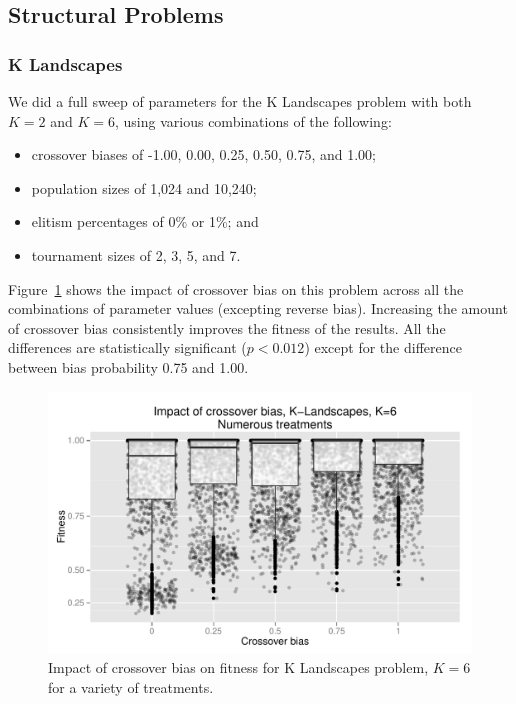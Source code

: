\documentclass{sig-alternate}
\begin{document}
\subsection{Structural Problems}

\subsubsection{K Landscapes}

We did a full sweep of parameters for the K Landscapes problem with both $K=2$ and $K=6$, 
using various combinations of the following:

\begin{itemize}
	\item crossover biases of -1.00, 0.00, 0.25, 0.50, 0.75, and 1.00;
	\item population sizes of 1,024 and 10,240;
	\item elitism percentages of 0\% or 1\%; and
	\item tournament sizes of 2, 3, 5, and 7.
\end{itemize}

Figure~\ref{fig:KLandscapes6_results} shows the impact of crossover bias on this problem across all the combinations of
parameter values (excepting reverse bias). Increasing the amount of crossover bias consistently improves the fitness of
the results. All the differences are statistically significant ($p < 0.012$) except for the difference between bias
probability 0.75 and 1.00.

%
%
%
%

\begin{figure}
\centering
\includegraphics[width=0.45 \textwidth]{Plots/KLandscapes6_XO_bias_impact_transformed_boxplot_alpha075.pdf}
\caption{Impact of crossover bias on fitness for K Landscapes problem, $K=6$ for a variety of treatments.}
\label{fig:KLandscapes6_results}
\end{figure}
\end{document}
